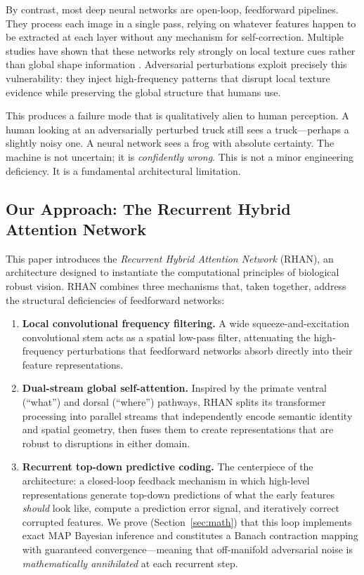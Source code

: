 \documentclass[12pt,a4paper]{article}
\begin{document}
By contrast, most deep neural networks are open-loop, feedforward pipelines.
They process each image in a single pass, relying on whatever features happen
to be extracted at each layer without any mechanism for self-correction.
Multiple studies have shown that these networks rely strongly on local texture
cues rather than global shape information
\citep{geirhos2019imagenet,brendel2019approximating}. Adversarial perturbations
exploit precisely this vulnerability: they inject high-frequency patterns that
disrupt local texture evidence while preserving the global structure that
humans use.

This produces a failure mode that is qualitatively alien to human perception.
A human looking at an adversarially perturbed truck still sees a truck---perhaps
a slightly noisy one. A neural network sees a frog with absolute certainty.
The machine is not uncertain; it is \textit{confidently wrong}. This is
not a minor engineering deficiency. It is a fundamental architectural
limitation.

\subsection{Our Approach: The Recurrent Hybrid Attention Network}

This paper introduces the \textit{Recurrent Hybrid Attention Network}
(RHAN), an architecture designed to instantiate the computational principles
of biological robust vision. RHAN combines three mechanisms that, taken
together, address the structural deficiencies of feedforward networks:

\begin{enumerate}[leftmargin=1.5em]
  \item \textbf{Local convolutional frequency filtering.} A wide
        squeeze-and-excitation convolutional stem acts as a spatial low-pass
        filter, attenuating the high-frequency perturbations that feedforward
        networks absorb directly into their feature representations.
  \item \textbf{Dual-stream global self-attention.} Inspired by the primate
        ventral (``what'') and dorsal (``where'') pathways, RHAN splits its
        transformer processing into parallel streams that independently encode
        semantic identity and spatial geometry, then fuses them to create
        representations that are robust to disruptions in either domain.
  \item \textbf{Recurrent top-down predictive coding.} The centerpiece of the
        architecture: a closed-loop feedback mechanism in which high-level
        representations generate top-down predictions of what the early features
        \textit{should} look like, compute a prediction error signal, and
        iteratively correct corrupted features. We prove (Section~\ref{sec:math})
        that this loop implements exact MAP Bayesian inference and constitutes
        a Banach contraction mapping with guaranteed convergence---meaning that
        off-manifold adversarial noise is \textit{mathematically annihilated}
        at each recurrent step.
\end{enumerate}
\end{document}
